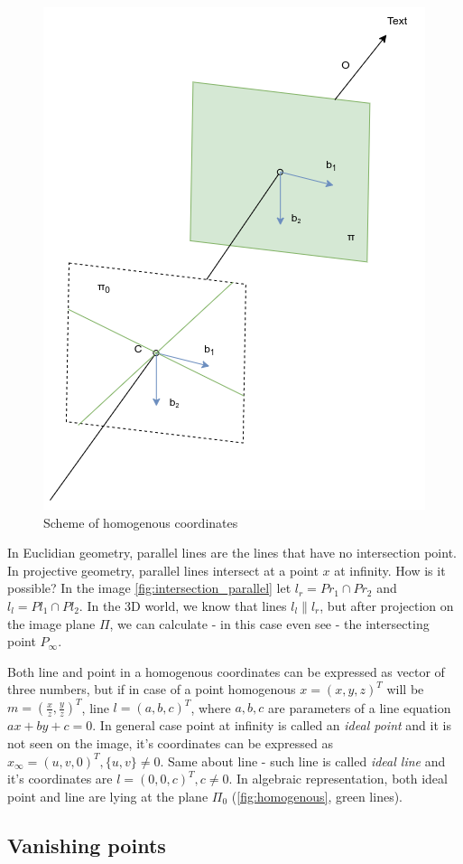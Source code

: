 \begin{figure}[h]
    \centering
    \includegraphics[width=.5\textwidth]{graphics/homogenous.png}
    \caption{Scheme of homogenous coordinates}
    \label{fig:homogenous}
\end{figure}

In Euclidian geometry, parallel lines are the lines that have no intersection point. 
In projective geometry, parallel lines intersect at a point $x$ at infinity. 
How is it possible? 
In the image \autoref{fig:intersection_parallel} let $l_r = Pr_1 \cap Pr_2 $ and $l_l = Pl_1 \cap Pl_2$. 
In the 3D world, we know that lines $l_l \parallel l_r$, but after projection on the image plane $\Pi$, we can calculate - in this case even see - the intersecting point $P_{\infty}$. 

Both line and point in a homogenous coordinates can be expressed as vector of three numbers, but if in case of a point homogenous $x = (x, y, z)^T$ will be $m = (\frac{x}{z}, \frac{y}{z})^T$, line $l = (a, b, c)^T$, where $a, b, c$ are parameters of a line equation $ax + by + c = 0$. 
In general case point at infinity is called an \textit{ideal point} and it is not seen on the image, it's coordinates can be expressed as $x_{\infty} = (u, v, 0)^T, \{u, v\} \neq 0$. Same about line - such line is called \textit{ideal line} and it's coordinates are $l = (0, 0, c)^T, c \neq 0$. In algebraic representation, both ideal point and line are lying at the plane $\Pi_0$ (\autoref{fig:homogenous}, green lines).

\subsection{Vanishing points}

